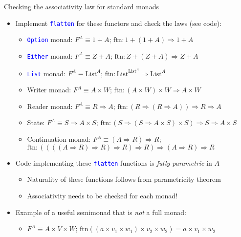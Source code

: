 \documentclass[english]{beamer}
\begin{document}
\begin{frame}{Checking the associativity law for standard monads}
\begin{itemize}
\item Implement \texttt{\textcolor{blue}{\footnotesize{}flatten}} for these
functors and check the laws (see code):
\begin{itemize}
\item \texttt{\textcolor{blue}{\footnotesize{}Option}} monad: $F^{A}\equiv1+A$;
$\text{ftn}:1+\left(1+A\right)\Rightarrow1+A$
\item \texttt{\textcolor{blue}{\footnotesize{}Either}} monad: $F^{A}\equiv Z+A$;
$\text{ftn}:Z+\left(Z+A\right)\Rightarrow Z+A$
\item \texttt{\textcolor{blue}{\footnotesize{}List}} monad: $F^{A}\equiv\text{List}^{A}$;
$\text{ftn}:\text{List}^{\text{List}^{A}}\Rightarrow\text{List}^{A}$
\item Writer monad: $F^{A}\equiv A\times W$; $\text{ftn}:\left(A\times W\right)\times W\Rightarrow A\times W$
\item Reader monad: $F^{A}\equiv R\Rightarrow A$; $\text{ftn}:\left(R\Rightarrow\left(R\Rightarrow A\right)\right)\Rightarrow R\Rightarrow A$
\item State: $F^{A}\equiv S\Rightarrow A\times S$; $\text{ftn}:\left(S\Rightarrow\left(S\Rightarrow A\times S\right)\times S\right)\Rightarrow S\Rightarrow A\times S$
\item Continuation monad: $F^{A}\equiv\left(A\Rightarrow R\right)\Rightarrow R$;
$\text{ftn}:\left(\left(\left(\left(A\Rightarrow R\right)\Rightarrow R\right)\Rightarrow R\right)\Rightarrow R\right)\Rightarrow\left(A\Rightarrow R\right)\Rightarrow R$
\end{itemize}
\item Code implementing these \texttt{\textcolor{blue}{\footnotesize{}flatten}}
functions is \emph{fully parametric} in $A$
\begin{itemize}
\item Naturality of these functions follows from parametricity theorem
\item Associativity needs to be checked for each monad!
\end{itemize}
\item Example of a useful semimonad that is \emph{not} a full monad:
\begin{itemize}
\item $F^{A}\equiv A\times V\times W$; $\text{ftn}\left(\left(a\times v_{1}\times w_{1}\right)\times v_{2}\times w_{2}\right)=a\times v_{1}\times w_{2}$

\end{itemize}
\end{itemize}
\end{frame}
\end{document}
